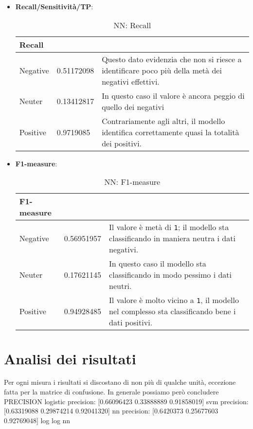 \begin{itemize}
				\item \textbf{Recall/Sensitività/TP}:
				
				\begin{table} [H]
					\caption{NN: Recall}
					\label{tab:RecallNN}
					\centering
					\begin{tabular}{llp{}}
						\toprule 
						\textbf{Recall}	\\
						\midrule
						Negative  & 0.51172098  & Questo dato evidenzia che non si riesce a identificare poco più della metà dei negativi effettivi.\\
						Neuter & 0.13412817 & In questo caso il valore è ancora peggio di quello dei negativi\\
						Positive & 0.9719085 & Contrariamente agli altri, il modello identifica correttamente quasi la totalità dei positivi.\\
						\bottomrule
					\end{tabular}
				\end{table}
				\item \textbf{F1-measure}:
				
				\begin{table} [H]
					\caption{NN: F1-measure}
					\label{tab:F1-measureNN}
					\centering
					\begin{tabular}{llp{}}
						\toprule 
						\textbf{F1-measure}	\\
						\midrule
						Negative  & 0.56951957  & Il valore è metà di \verb|1|; il modello sta classificando in maniera neutra i dati negativi.\\
						Neuter & 0.17621145 & In questo caso il modello sta classificando in modo pessimo i dati neutri.\\
						Positive & 0.94928485 & Il valore è molto vicino a \verb|1|, il modello nel complesso sta classificando bene i dati positivi.\\
						\bottomrule
					\end{tabular}
				\end{table}
		\end{itemize}
	
	\section {Analisi dei risultati}
		Per ogni misura i risultati si discostano di non più di qualche unità, eccezione fatta per la matrice di confusione. In generale possiamo però concludere 
		PRECISION
		logistic precision: [0.66096423 0.33888889 0.91858019]
		svm		 precision: [0.63319088 0.29874214 0.92041320]
		nn		 precision: [0.6420373  0.25677603 0.92769048]
								log 	    log		     nn
								
